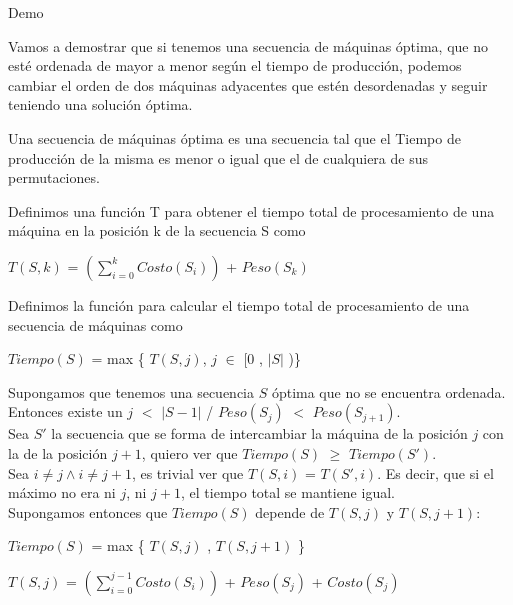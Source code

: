 \begin{subsubsection}{Demo}

Vamos a demostrar que si tenemos una secuencia de máquinas óptima, que no esté
ordenada de mayor a menor según el tiempo de producción, podemos cambiar
el orden de dos máquinas adyacentes que estén desordenadas y seguir teniendo
una solución óptima.

Una secuencia de máquinas óptima es una secuencia tal que el Tiempo
de producción de la misma es menor o igual que el de cualquiera de sus
permutaciones.

Definimos una función T para obtener el tiempo total de procesamiento de
una máquina en la posición k de la secuencia S como

\begin{center}
$T(S,k)$ = $\left( \displaystyle\sum\limits_{i=0}^k Costo(S_i) \right)$  + $Peso(S_k)$\\
\end{center}


Definimos la función para calcular el tiempo total de procesamiento de
una secuencia de máquinas como
\begin{center}
$Tiempo(S)$ = max \{ $T(S,j)$, $j$ $\in$ [0 , $\vert S \vert$ )\}
\end{center}


Supongamos que tenemos una secuencia $S$ óptima que no se encuentra ordenada.
Entonces existe un $j$ $<$ $\vert S - 1\vert$ / $Peso(S_j)$ $<$ $Peso(S_{j+1})$.\\


Sea $S'$ la secuencia que se forma de intercambiar la máquina de la posición $j$ con la de la posición $j + 1$, quiero ver que $Tiempo(S)$ $\geq$ $Tiempo(S')$.\\

Sea $i \neq j \wedge i \neq j + 1$, es trivial ver que $T(S,i)$ = $T(S',i)$. Es decir, que si el máximo no era ni $j$, ni $j + 1$, el tiempo total se mantiene igual.\\

Supongamos entonces que $Tiempo(S)$ depende de $T(S, j)$ y $T(S, j + 1)$:\\

\begin{center}

$Tiempo(S)$ = max \{ $T(S,j)$ , $T(S,j+1)$ \}

$T(S,j)$ = $\left(\displaystyle\sum\limits_{i=0}^{j-1} Costo(S_i) \right)$ + $Peso(S_j)$ + $Costo(S_j)$


\end{center}
\end{subsubsection}
